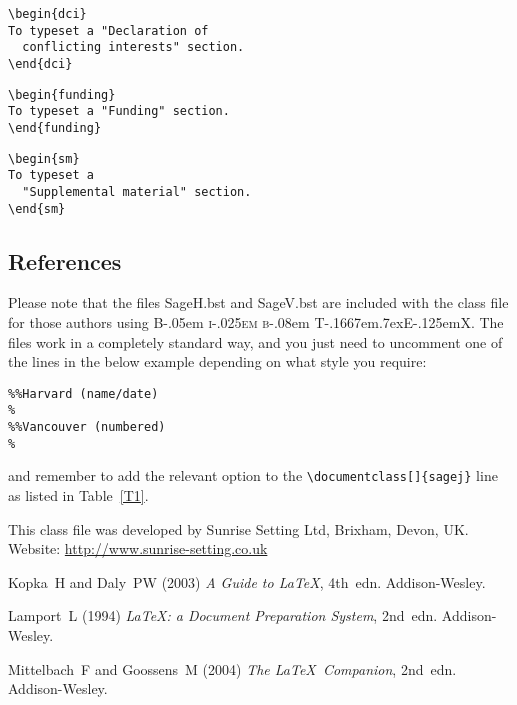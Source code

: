 \documentclass[Afour,sageh,times]{sagej}
\newcommand\BibTeX{{\rmfamily B\kern-.05em \textsc{i\kern-.025em b}\kern-.08em
T\kern-.1667em\lower.7ex\hbox{E}\kern-.125emX}}
\begin{document}

\begin{verbatim}
\begin{dci}
To typeset a "Declaration of
  conflicting interests" section.
\end{dci}
\end{verbatim}

\begin{verbatim}
\begin{funding}
To typeset a "Funding" section.
\end{funding}
\end{verbatim}

\begin{verbatim}
\begin{sm}
To typeset a
  "Supplemental material" section.
\end{sm}
\end{verbatim}

\subsection{References}
Please note that the files \textsf{SageH.bst} and \textsf{SageV.bst} are included with the class file
for those authors using \BibTeX.
The files work in a completely standard way, and you just need to uncomment one of the lines in the below example depending on what style you require:
\begin{verbatim}
%%Harvard (name/date)
%
%%Vancouver (numbered)
%

\end{verbatim}
and remember to add the relevant option to the \verb+\documentclass[]{sagej}+ line as listed in Table~\ref{T1}. 

%

\begin{acks}
This class file was developed by Sunrise Setting Ltd,
Brixham, Devon, UK.\\
Website: \url{http://www.sunrise-setting.co.uk}
\end{acks}

\begin{thebibliography}{99}
Kopka~H and Daly~PW (2003) \textit{A Guide to \LaTeX}, 4th~edn.
Addison-Wesley.

Lamport~L (1994) \textit{\LaTeX: a Document Preparation System},
2nd~edn. Addison-Wesley.

Mittelbach~F and Goossens~M (2004) \textit{The \LaTeX\ Companion},
2nd~edn. Addison-Wesley.

\end{thebibliography}
\end{document}
